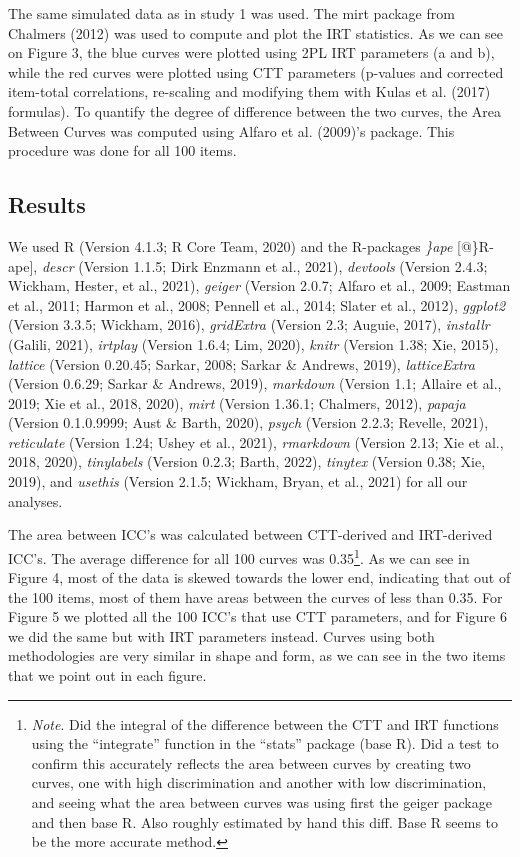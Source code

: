 \documentclass[
  man]{apa6}
\begin{document}
The same simulated data as in study 1 was used. The mirt package from Chalmers (2012) was used to compute and plot the IRT statistics. As we can see on Figure 3, the blue curves were plotted using 2PL IRT parameters (a and b), while the red curves were plotted using CTT parameters (p-values and corrected item-total correlations, re-scaling and modifying them with Kulas et al. (2017) formulas). To quantify the degree of difference between the two curves, the Area Between Curves was computed using Alfaro et al. (2009)'s package. This procedure was done for all 100 items.

\hypertarget{results-1}{%
\subsection{Results}\label{results-1}}

We used R (Version 4.1.3; R Core Team, 2020) and the R-packages \emph{\}ape} {[}@\}R-ape{]}, \emph{descr} (Version 1.1.5; Dirk Enzmann et al., 2021), \emph{devtools} (Version 2.4.3; Wickham, Hester, et al., 2021), \emph{geiger} (Version 2.0.7; Alfaro et al., 2009; Eastman et al., 2011; Harmon et al., 2008; Pennell et al., 2014; Slater et al., 2012), \emph{ggplot2} (Version 3.3.5; Wickham, 2016), \emph{gridExtra} (Version 2.3; Auguie, 2017), \emph{installr} (Galili, 2021), \emph{irtplay} (Version 1.6.4; Lim, 2020), \emph{knitr} (Version 1.38; Xie, 2015), \emph{lattice} (Version 0.20.45; Sarkar, 2008; Sarkar \& Andrews, 2019), \emph{latticeExtra} (Version 0.6.29; Sarkar \& Andrews, 2019), \emph{markdown} (Version 1.1; Allaire et al., 2019; Xie et al., 2018, 2020), \emph{mirt} (Version 1.36.1; Chalmers, 2012), \emph{papaja} (Version 0.1.0.9999; Aust \& Barth, 2020), \emph{psych} (Version 2.2.3; Revelle, 2021), \emph{reticulate} (Version 1.24; Ushey et al., 2021), \emph{rmarkdown} (Version 2.13; Xie et al., 2018, 2020), \emph{tinylabels} (Version 0.2.3; Barth, 2022), \emph{tinytex} (Version 0.38; Xie, 2019), and \emph{usethis} (Version 2.1.5; Wickham, Bryan, et al., 2021) for all our analyses.

The area between ICC's was calculated between CTT-derived and IRT-derived ICC's. The average difference for all 100 curves was 0.35\footnote{\emph{Note}. Did the integral of the difference between the CTT and IRT functions using the ``integrate'' function in the ``stats'' package (base R). Did a test to confirm this accurately reflects the area between curves by creating two curves, one with high discrimination and another with low discrimination, and seeing what the area between curves was using first the geiger package and then base R. Also roughly estimated by hand this diff. Base R seems to be the more accurate method.}. As we can see in Figure 4, most of the data is skewed towards the lower end, indicating that out of the 100 items, most of them have areas between the curves of less than 0.35.
For Figure 5 we plotted all the 100 ICC's that use CTT parameters, and for Figure 6 we did the same but with IRT parameters instead. Curves using both methodologies are very similar in shape and form, as we can see in the two items that we point out in each figure.
\end{document}
